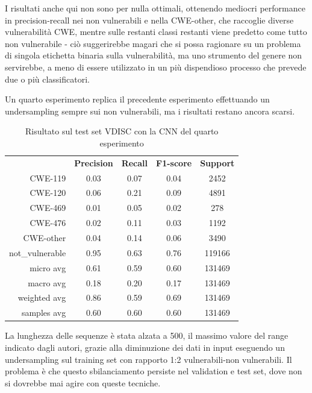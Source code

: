 \documentclass[conference]{IEEEtran}
\begin{document}
I risultati anche qui non sono per nulla ottimali, ottenendo mediocri performance in precision-recall nei non vulnerabili e nella CWE-other, che raccoglie diverse vulnerabilità CWE, mentre sulle restanti classi restanti viene predetto come tutto non vulnerabile - ciò suggerirebbe magari che si possa ragionare su un problema di singola etichetta binaria sulla vulnerabilità, ma uno strumento del genere non servirebbe, a meno di essere utilizzato in un più dispendioso processo che prevede due o più classificatori.

Un quarto esperimento replica il precedente esperimento effettuando un undersampling sempre sui non vulnerabili, ma i risultati restano ancora scarsi.

\begin{table}[H]
    \begin{tabular}{rcccc}
        \multicolumn{1}{l}{} & \textbf{Precision} & \textbf{Recall} & \textbf{F1-score} & \textbf{Support} \\
        CWE-119         & 0.03 & 0.07 & 0.04 & 2452   \\
        CWE-120         & 0.06 & 0.21 & 0.09 & 4891   \\
        CWE-469         & 0.01 & 0.05 & 0.02 & 278    \\
        CWE-476         & 0.02 & 0.11 & 0.03 & 1192   \\
        CWE-other       & 0.04 & 0.14 & 0.06 & 3490   \\
        not\_vulnerable & 0.95 & 0.63 & 0.76 & 119166 \\
        micro avg       & 0.61 & 0.59 & 0.60 & 131469 \\
        macro avg       & 0.18 & 0.20 & 0.17 & 131469 \\
        weighted avg    & 0.86 & 0.59 & 0.69 & 131469 \\
        samples avg     & 0.60 & 0.60 & 0.60 & 131469
    \end{tabular}
    \caption{Risultato sul test set VDISC con la CNN del quarto esperimento}
\end{table}
%
La lunghezza delle sequenze è stata alzata a 500, il massimo valore del range indicato dagli autori, grazie alla diminuzione dei dati in input eseguendo un undersampling sul training set con rapporto 1:2 vulnerabili-non vulnerabili. Il problema è che questo sbilanciamento persiste nel validation e test set, dove non si dovrebbe mai agire con queste tecniche.
\end{document}
